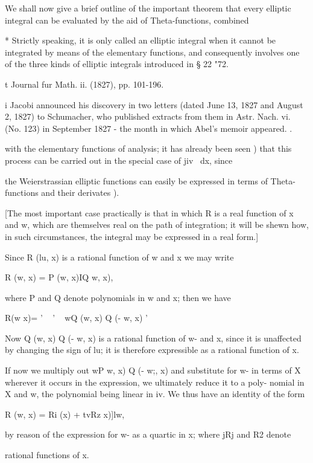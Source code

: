 We shall now give a brief outline of the important theorem that every
elliptic integral can be evaluated by the aid of Theta-functions,
combined

* Strictly speaking, it is only called an elliptic integral when it
cannot be integrated by means of the elementary functions, and
consequently involves one of the three kinds of elliptic integrals
introduced in § 22 "72.

t Journal fur Math. ii. (1827), pp. 101-196.

i Jacobi announced his discovery in two letters (dated June 13, 1827
and August 2, 1827) to Schumacher, who published extracts from them in
Astr. Nach. vi. (No. 123) in September 1827 - the month in which
Abel's memoir appeared. .

%
%

with the elementary functions of analysis; it has already been seen
) that this process can be carried out in the special case of
jiv~ dx, since

the Weierstrassian elliptic functions can easily be expressed in terms
of Theta-functions and their derivates ).

[The most important case practically is that in which R is a real
function of x and w, which are themselves real on the path of
integration; it will be shewn how, in such circumstances, the
integral may be expressed in a real form.]

Since R (lu, x) is a rational function of w and x we may write

R (w, x) = P (w, x)IQ w, x),

where P and Q denote polynomials in w and x; then we have

R(w x)= ' ~ ' ~ wQ (w, x) Q (- w, x) '

Now Q (w, x) Q (- w, x) is a rational function of w- and x, since it
is unaffected by changing the sign of lu; it is therefore expressible
as a rational function of x.

If now we multiply out wP w, x) Q (- w;, x) and substitute for w- in
terms of X wherever it occurs in the expression, we ultimately reduce
it to a poly- nomial in X and w, the polynomial being linear in iv. We
thus have an identity of the form

R (w, x) = Ri (x) + tvRz x)]lw,

by reason of the expression for w- as a quartic in x; where jRj and
R2 denote

rational functions of x.


